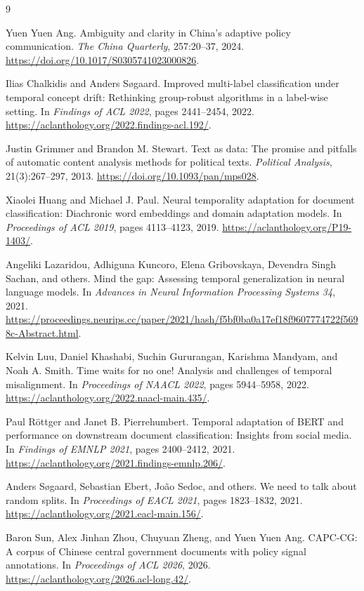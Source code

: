 \documentclass[11pt]{article}
\begin{document}
\begin{thebibliography}{9}

Yuen Yuen Ang.
\newblock Ambiguity and clarity in China's adaptive policy communication.
\newblock \emph{The China Quarterly}, 257:20--37, 2024.
\newblock \url{https://doi.org/10.1017/S0305741023000826}.

Ilias Chalkidis and Anders S{\o}gaard.
\newblock Improved multi-label classification under temporal concept drift: Rethinking group-robust algorithms in a label-wise setting.
\newblock In \emph{Findings of ACL 2022}, pages 2441--2454, 2022.
\newblock \url{https://aclanthology.org/2022.findings-acl.192/}.

Justin Grimmer and Brandon M. Stewart.
\newblock Text as data: The promise and pitfalls of automatic content analysis methods for political texts.
\newblock \emph{Political Analysis}, 21(3):267--297, 2013.
\newblock \url{https://doi.org/10.1093/pan/mps028}.

Xiaolei Huang and Michael J. Paul.
\newblock Neural temporality adaptation for document classification: Diachronic word embeddings and domain adaptation models.
\newblock In \emph{Proceedings of ACL 2019}, pages 4113--4123, 2019.
\newblock \url{https://aclanthology.org/P19-1403/}.

Angeliki Lazaridou, Adhiguna Kuncoro, Elena Gribovskaya, Devendra Singh Sachan, and others.
\newblock Mind the gap: Assessing temporal generalization in neural language models.
\newblock In \emph{Advances in Neural Information Processing Systems 34}, 2021.
\newblock \url{https://proceedings.neurips.cc/paper/2021/hash/f5bf0ba0a17ef18f9607774722f5698c-Abstract.html}.

Kelvin Luu, Daniel Khashabi, Suchin Gururangan, Karishma Mandyam, and Noah A. Smith.
\newblock Time waits for no one! Analysis and challenges of temporal misalignment.
\newblock In \emph{Proceedings of NAACL 2022}, pages 5944--5958, 2022.
\newblock \url{https://aclanthology.org/2022.naacl-main.435/}.

Paul R{\"o}ttger and Janet B. Pierrehumbert.
\newblock Temporal adaptation of BERT and performance on downstream document classification: Insights from social media.
\newblock In \emph{Findings of EMNLP 2021}, pages 2400--2412, 2021.
\newblock \url{https://aclanthology.org/2021.findings-emnlp.206/}.

Anders S{\o}gaard, Sebastian Ebert, Jo{\~a}o Sedoc, and others.
\newblock We need to talk about random splits.
\newblock In \emph{Proceedings of EACL 2021}, pages 1823--1832, 2021.
\newblock \url{https://aclanthology.org/2021.eacl-main.156/}.

Baron Sun, Alex Jinhan Zhou, Chuyuan Zheng, and Yuen Yuen Ang.
\newblock CAPC-CG: A corpus of Chinese central government documents with policy signal annotations.
\newblock In \emph{Proceedings of ACL 2026}, 2026.
\newblock \url{https://aclanthology.org/2026.acl-long.42/}.

\end{thebibliography}
\end{document}
